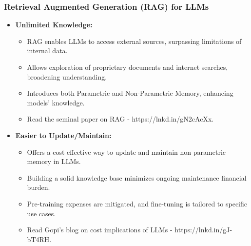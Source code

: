 




\begin{frame}[fragile]\frametitle{Retrieval Augmented Generation (RAG) for LLMs}
\begin{itemize}
  \item \textbf{Unlimited Knowledge:}
    \begin{itemize}
      \item RAG enables LLMs to access external sources, surpassing limitations of internal data.
      \item Allows exploration of proprietary documents and internet searches, broadening understanding.
      \item Introduces both Parametric and Non-Parametric Memory, enhancing models' knowledge.
      \item Read the seminal paper on RAG - https://lnkd.in/gN2cAcXx.
    \end{itemize}
  
  \item \textbf{Easier to Update/Maintain:}
    \begin{itemize}
      \item Offers a cost-effective way to update and maintain non-parametric memory in LLMs.
      \item Building a solid knowledge base minimizes ongoing maintenance financial burden.
      \item Pre-training expenses are mitigated, and fine-tuning is tailored to specific use cases.
      \item Read Gopi's blog on cost implications of LLMs - https://lnkd.in/gJ-bT4RH.
    \end{itemize}
\end{itemize}

\end{frame}

